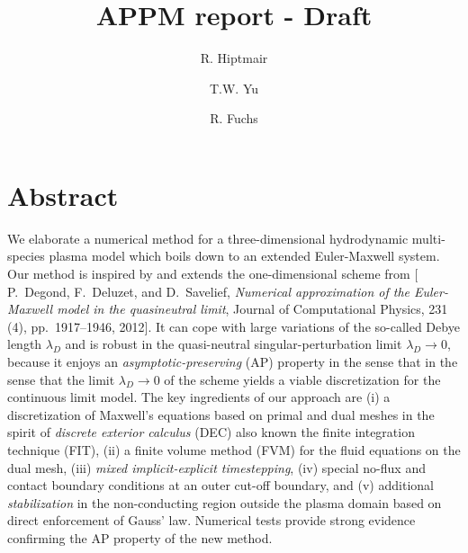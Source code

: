 \documentclass{article}
\title{APPM report - Draft}
\author[1]{R. Hiptmair}
\author[1]{T.W. Yu}
\author[2]{R. Fuchs}
\affil[1]{Seminar for Applied Mathematics , ETH Z\"{u}rich}
\affil[2]{IET Institut für Energietechnik, OST}
\date{}
\newcommand{\todo}[1]{\textcolor{blue}{\fbox{\textbf{TODO: #1}}}}
\begin{document}
\maketitle

\section*{Abstract}

We elaborate a numerical method for a three-dimensional hydrodynamic multi-species plasma
model which boils down to an extended Euler-Maxwell system. Our method is inspired by and
extends the one-dimensional scheme from $[$P.~Degond, F.~Deluzet, and D.~Savelief,
\emph{Numerical approximation of the Euler-Maxwell model in the quasineutral limit}, Journal of
Computational Physics, 231 (4), pp.~1917--1946, 2012$]$. It can cope with large variations
of the so-called Debye length $\lambda_D$ and is robust in the quasi-neutral
singular-perturbation limit $\lambda_D\to 0$, because it enjoys an
\emph{asymptotic-preserving} (AP) property in the sense that in the sense that the limit
$\lambda_D\to 0$ of the scheme yields a viable discretization for the continuous limit
model. The key ingredients of our approach are (i) a discretization of Maxwell's equations
based on primal and dual meshes in the spirit of \emph{discrete exterior calculus} (DEC)
also known the finite integration technique (FIT), (ii) a finite volume method (FVM) for
the fluid equations on the dual mesh, (iii) \emph{mixed implicit-explicit timestepping},
(iv) special no-flux and contact boundary conditions at an outer cut-off boundary, and (v)
additional \emph{stabilization} in the non-conducting region outside the plasma domain
based on direct enforcement of Gauss' law. Numerical tests provide strong evidence
confirming the AP property of the new method.



\end{document}
